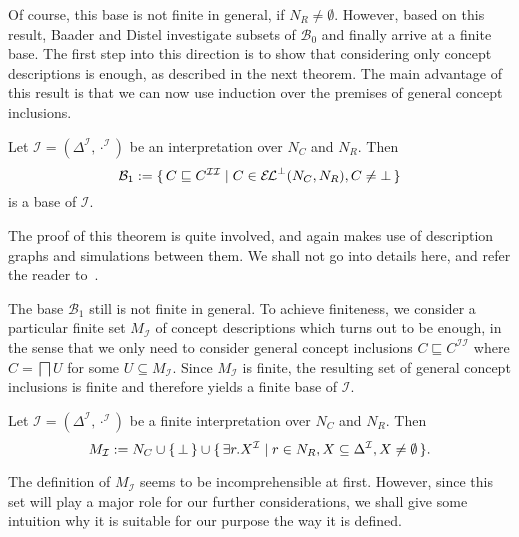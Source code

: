 Of course, this base is not finite in general, \ie if $N_R \neq \emptyset$.  However,
based on this result, Baader and Distel investigate subsets of $\mathcal{B}_0$ and finally
arrive at a finite base.  The first step into this direction is to show that considering
only \ELbot concept descriptions is enough, as described in the next theorem.  The main
advantage of this result is that we can now use induction over the premises of general
concept inclusions.

\begin{Theorem}
  \label{thm:Felix-base-B1}
  Let $\mathcal{I} = (\Delta^{\mathcal{I}}, \cdot^{\mathcal{I}})$ be an interpretation
  over $N_C$ and $N_R$.  Then
  \begin{equation}
    \label{eq:21}
    \mathcal{B}_1 := {\{\, C \sqsubseteq C^{\mathcal{I}\mathcal{I}} \mid C \in {\ensuremath{{\mathcal{E}\kern-.3ex\mathcal{L}}^\bot}}(N_C,
      N_R), C \neq \bot \,\}}
  \end{equation}
  is a base of $\mathcal{I}$.
\end{Theorem}

The proof of this theorem is quite involved, and again makes use of \EL description graphs
and simulations between them.  We shall not go into details here, and refer the reader
to~\cite[Section 5.1.1]{Diss-Felix}.

The base $\mathcal{B}_1$ still is not finite in general.  To achieve finiteness, we
consider a particular finite set $M_{\mathcal{I}}$ of concept descriptions which turns out
to be enough, in the sense that we only need to consider general concept inclusions $C
\sqsubseteq C^{\mathcal{I}\mathcal{I}}$ where $C = \bigsqcap U$ for some $U \subseteq
M_{\mathcal{I}}$.  Since $M_{\mathcal{I}}$ is finite, the resulting set of general concept
inclusions is finite and therefore yields a finite base of $\mathcal{I}$.

\begin{Definition}[$M_{\mathcal{I}}$]
  \label{def:M_I}
  Let $\mathcal{I} = (\Delta^{\mathcal{I}}, \cdot^{\mathcal{I}})$ be a finite
  interpretation over $N_C$ and $N_R$.  Then
  \begin{equation*}
    M_{\mathcal{I}} := N_C \cup {\ensuremath{\{\, \bot \,\}}} \cup {\ensuremath{\{\, \exists r. X^{\mathcal{I}} \mid
      r \in N_R, X \subseteq \Delta^{\mathcal{I}}, X \neq \emptyset \,\}}}.
  \end{equation*}
\end{Definition}

The definition of $M_{\mathcal{I}}$ seems to be incomprehensible at first.  However, since
this set will play a major role for our further considerations, we shall give some
intuition why it is suitable for our purpose the way it is defined.

